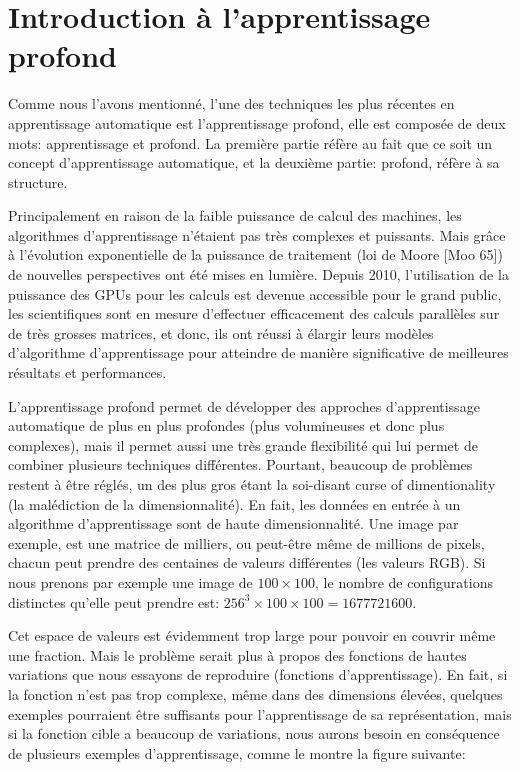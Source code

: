 \section{Introduction à l'apprentissage profond}

	Comme nous l'avons mentionné, l'une des techniques les plus récentes en apprentissage automatique est l'apprentissage profond, elle est composée de deux mots: apprentissage et profond. La première partie réfère au fait que ce soit un concept d'apprentissage automatique, et la deuxième partie: profond, réfère à sa structure.

	Principalement en raison de la faible puissance de calcul des machines, les algorithmes d'apprentissage n'étaient pas très complexes et puissants. Mais grâce à l'évolution exponentielle de la puissance de traitement (loi de Moore [Moo 65]) de nouvelles perspectives ont été mises en lumière.
Depuis 2010, l'utilisation de la puissance des GPUs pour les calculs est devenue accessible pour le grand public, les scientifiques sont en mesure d'effectuer efficacement des calculs parallèles sur de très grosses matrices, et donc, ils ont réussi à élargir leurs modèles d'algorithme d'apprentissage pour atteindre de manière significative de meilleures résultats et performances.


	L'apprentissage profond permet de développer des approches d'apprentissage automatique de plus en plus profondes (plus volumineuses et donc plus complexes), mais il permet aussi une très grande flexibilité qui lui permet de combiner plusieurs techniques différentes. Pourtant, beaucoup de problèmes restent à être réglés, un des plus gros étant la soi-disant curse of dimentionality (la malédiction de la dimensionnalité). En fait, les données en entrée à un algorithme d'apprentissage sont de haute dimensionnalité. Une image par exemple, est une matrice de milliers, ou peut-être même de millions de pixels, chacun peut prendre des centaines de valeurs différentes (les valeurs RGB). Si nous prenons par exemple une image de $100 \times 100$, le nombre de configurations distinctes qu'elle peut prendre est:
$256^{3} \times 100 \times 100 = 1 677 721 600$.

	Cet espace de valeurs est évidemment trop large pour pouvoir en couvrir même une fraction. Mais le problème serait plus à propos des fonctions de hautes variations que nous essayons de reproduire (fonctions d'apprentissage). En fait, si la fonction n'est pas trop complexe, même dans des dimensions élevées, quelques exemples pourraient être suffisants pour l'apprentissage de sa représentation, mais si la fonction cible a beaucoup de variations, nous aurons besoin en conséquence de plusieurs exemples d'apprentissage, comme le montre la figure suivante:

